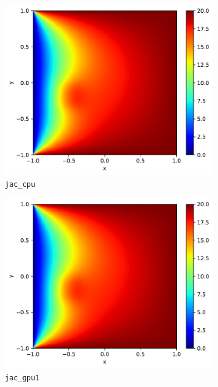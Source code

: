 \begin{figure}[!th]
\centering
\begin{subfigure}{.5\textwidth}
  \centering
  \includegraphics[width=.9\linewidth]{data_3/pos/jac_cpu.pdf}
  \caption{\texttt{jac\_cpu}}
  \label{fig:jac_gpu}
\end{subfigure}%
\begin{subfigure}{.5\textwidth}
  \centering
  \includegraphics[width=.9\linewidth]{data_3/pos/jac_gpu1.pdf}
  \caption{\texttt{jac\_gpu1}}
  \label{fig:jac_gpu1}
\end{subfigure}
\begin{subfigure}{.5\textwidth}
  \centering

\end{subfigure}
\end{figure}
